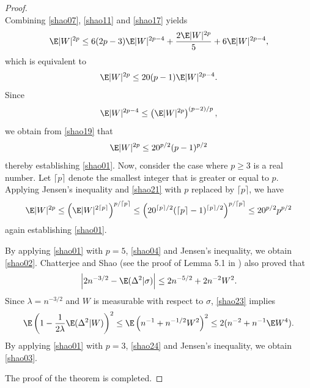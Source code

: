 \begin{proof}
\begin{equation}
		\end{equation}
		Combining \eqref{shao07}, \eqref{shao11} and \eqref{shao17} yields
		\begin{equation*}
			\E|W|^{2p}\le 	6(2p-3)\E|W|^{2p-4}+\frac{2\E|W|^{2p}}{5}+6\E|W|^{2p-4},
		\end{equation*}
		which is equivalent to
		\begin{equation}\label{shao19}
			\E|W|^{2p}\le 	20(p-1)\E|W|^{2p-4}.
		\end{equation}
		Since 
		\[\E|W|^{2p-4}\le \left(\E|W|^{2p}\right)^{(p-2)/p},\]
		we obtain from \eqref{shao19} that
		\begin{equation}\label{shao21}
			\E|W|^{2p}\le 20^{p/2}(p-1)^{p/2}
		\end{equation}
		thereby establishing \eqref{shao01}. Now, consider the case where $p\ge 3$ is a real number.
		Let $\lceil p \rceil$ denote the smallest integer that is greater or equal to $p$.
		Applying Jensen's inequality and \eqref{shao21} with $p$ replaced by $\lceil p \rceil$, we have
		\begin{equation*}
			\E|W|^{2p}\le \left(\E|W|^{2\lceil p\rceil}\right)^{p/\lceil p\rceil} \le \left(20^{\lceil p\rceil/2}(\lceil p\rceil-1)^{\lceil p\rceil/2} \right)^{p/\lceil p\rceil}\le 20^{p/2} p^{p/2}
		\end{equation*}
		again establishing \eqref{shao01}.
		
		
By applying \eqref{shao01} with $p=5$, \eqref{shao04} and Jensen's inequality, we obtain \eqref{shao02}.
		Chatterjee and Shao \cite{chatterjee2011nonnormal} (see the proof of Lemma 5.1 in \cite{chatterjee2011nonnormal}) also proved that 
		\begin{equation}\label{shao23}
			\left|2n^{-3/2}-\E(\Delta^2|\sigma)\right|\le 2n^{-5/2}+2n^{-2}W^2.
		\end{equation}
		Since $\lambda=n^{-3/2}$ and $W$ is measurable with respect to $\sigma$, \eqref{shao23} implies
		\begin{equation}\label{shao24}
			\E\left(1-\frac{1}{2\lambda}\E(\Delta^2|W)\right)^2\le \E\left(n^{-1}+n^{-1/2}W^2\right)^2\le 2(n^{-2}+n^{-1}\E W^4).
		\end{equation}
		By applying \eqref{shao01} with $p=3$, \eqref{shao24}  and Jensen's inequality, we obtain \eqref{shao03}.
		
		The proof of the theorem is completed.
	\end{proof}
	
